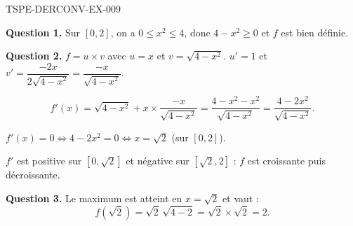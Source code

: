 \begin{corrige}{TSPE-DERCONV-EX-009}

\textbf{Question 1.} Sur $[0,2]$, on a $0 \leq x^2 \leq 4$, donc $4 - x^2 \geq 0$ et $f$ est bien définie.


\textbf{Question 2.} $f = u \times v$ avec $u=x$ et $v=\sqrt{4-x^2}$.
$u'=1$ et $v' = \dfrac{-2x}{2\sqrt{4-x^2}} = \dfrac{-x}{\sqrt{4-x^2}}$.

\[ f'(x) = \sqrt{4-x^2} + x \times \frac{-x}{\sqrt{4-x^2}} = \frac{4-x^2-x^2}{\sqrt{4-x^2}} = \frac{4-2x^2}{\sqrt{4-x^2}}. \]

$f'(x) = 0 \iff 4-2x^2 = 0 \iff x = \sqrt{2}$ (sur $[0,2]$).

$f'$ est positive sur $[0,\sqrt{2}]$ et négative sur $[\sqrt{2}, 2]$ : $f$ est croissante puis décroissante.

\textbf{Question 3.} Le maximum est atteint en $x = \sqrt{2}$ et vaut :
\[ f(\sqrt{2}) = \sqrt{2}\,\sqrt{4-2} = \sqrt{2} \times \sqrt{2} = \boxed{2}. \]

\end{corrige}
